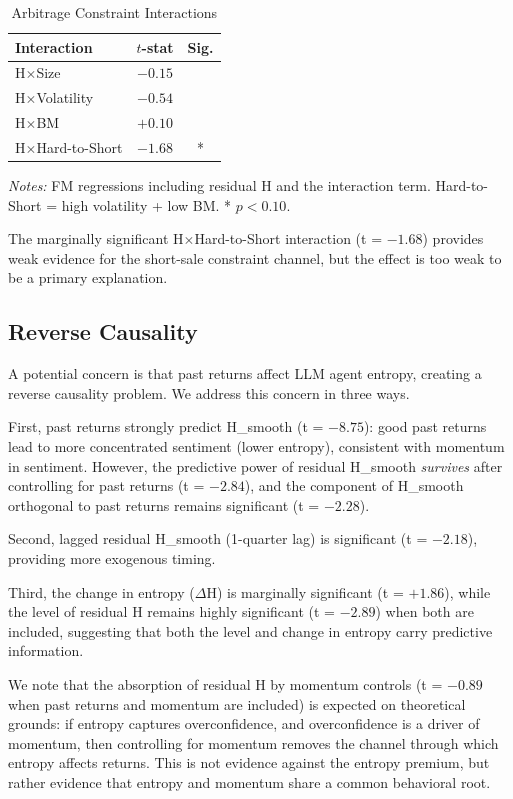 \documentclass[12pt,a4paper]{article}
\begin{document}
\begin{table}[H]
\centering
\caption{Arbitrage Constraint Interactions}
\label{tab:arb}
\small
\begin{tabular}{lcc}
\toprule
Interaction & $t$-stat & Sig. \\
\midrule
H$\times$Size & $-0.15$ & \\
H$\times$Volatility & $-0.54$ & \\
H$\times$BM & $+0.10$ & \\
H$\times$Hard-to-Short & $-1.68$ & * \\
\bottomrule
\end{tabular}
\end{table}
\noindent\textit{Notes:} FM regressions including residual H and the interaction term. Hard-to-Short = high volatility + low BM. * $p<0.10$.

The marginally significant H$\times$Hard-to-Short interaction (t = $-1.68$) provides weak evidence for the \citet{Boehme2006} short-sale constraint channel, but the effect is too weak to be a primary explanation.

\subsection{Reverse Causality}

A potential concern is that past returns affect LLM agent entropy, creating a reverse causality problem. We address this concern in three ways.

First, past returns strongly predict H\_smooth (t = $-8.75$): good past returns lead to more concentrated sentiment (lower entropy), consistent with momentum in sentiment. However, the predictive power of residual H\_smooth \textit{survives} after controlling for past returns (t = $-2.84$), and the component of H\_smooth orthogonal to past returns remains significant (t = $-2.28$).

Second, lagged residual H\_smooth (1-quarter lag) is significant (t = $-2.18$), providing more exogenous timing.

Third, the change in entropy ($\Delta$H) is marginally significant (t = $+1.86$), while the level of residual H remains highly significant (t = $-2.89$) when both are included, suggesting that both the level and change in entropy carry predictive information.

We note that the absorption of residual H by momentum controls (t = $-0.89$ when past returns and momentum are included) is expected on theoretical grounds: if entropy captures overconfidence, and overconfidence is a driver of momentum, then controlling for momentum removes the channel through which entropy affects returns. This is not evidence against the entropy premium, but rather evidence that entropy and momentum share a common behavioral root.
\end{document}
